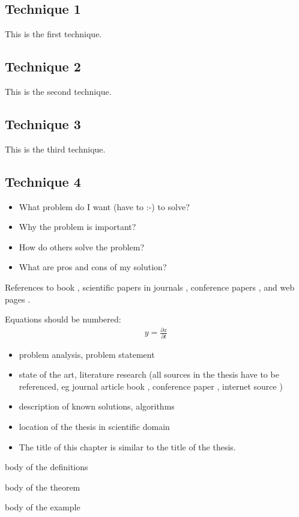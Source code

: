 \subsection{Technique 1}
This is the first technique.

\subsection{Technique 2}
This is the second technique.

\subsection{Technique 3}
This is the third technique.

\subsection{Technique 4}


\begin{itemize}
\item What problem do I want (have to :-) to solve?
\item Why the problem is important?
\item How do others solve the problem?
\item What are pros and cons of my solution?
\end{itemize}

References to 
book \cite{bib:book},
scientific papers in journals \cite{bib:article},
conference papers \cite{bib:conference},
and web pages \cite{bib:internet}.

Equations should be numbered:
\begin{align}
y = \frac{\partial x}{\partial t}
\end{align}

\begin{itemize}
\item problem analysis, problem statement
\item state of the art, literature research (all sources in the thesis have to be referenced, eg journal article \cite{bib:article} book \cite{bib:book}, conference paper \cite{bib:conference}, internet source \cite{bib:internet})
\item description of known solutions, algorithms
\item location of the thesis in scientific domain
\item The title of this chapter is similar to the title of the thesis.
\end{itemize}

\begin{Definition}\label{def:definition}
body of the definitions
\end{Definition}

\begin{Theorem}\label{t:theorem}
body of the theorem
\end{Theorem}

\begin{Example}\label{ex:example}
body of the example
\end{Example}



